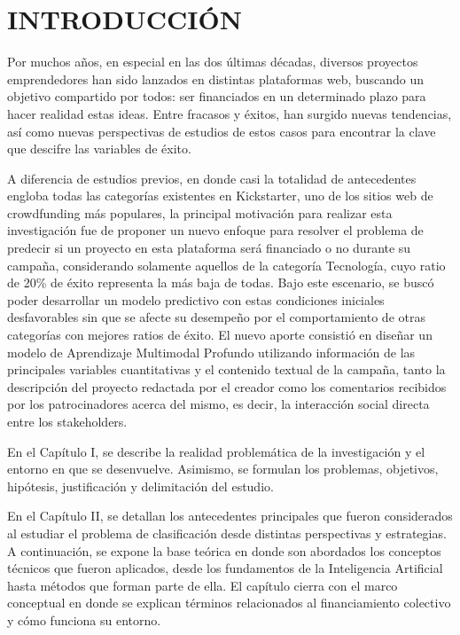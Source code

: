 
\chapter*{INTRODUCCIÓN}

Por muchos años, en especial en las dos últimas décadas, diversos proyectos emprendedores han sido lanzados en distintas plataformas web, buscando un objetivo compartido por todos: ser financiados en un determinado plazo para hacer realidad estas ideas. Entre fracasos y éxitos, han surgido nuevas tendencias, así como nuevas perspectivas de estudios de estos casos para encontrar la clave que descifre las variables de éxito.

A diferencia de estudios previos, en donde casi la totalidad de antecedentes engloba todas las categorías existentes en Kickstarter, uno de los sitios web de crowdfunding más populares, la principal motivación para realizar esta investigación fue de proponer un nuevo enfoque para resolver el problema de predecir si un proyecto en esta plataforma será financiado o no durante su campaña, considerando solamente aquellos de la categoría Tecnología, cuyo ratio de 20\% de éxito representa la más baja de todas. Bajo este escenario, se buscó poder desarrollar un modelo predictivo con estas condiciones iniciales desfavorables sin que se afecte su desempeño por el comportamiento de otras categorías con mejores ratios de éxito. El nuevo aporte consistió en diseñar un modelo de Aprendizaje Multimodal Profundo utilizando información de las principales variables cuantitativas y el contenido textual de la campaña, tanto la descripción del proyecto redactada por el creador como los comentarios recibidos por los patrocinadores acerca del mismo, es decir, la interacción social directa entre los stakeholders.

En el Capítulo I, se describe la realidad problemática de la investigación y el entorno en que se desenvuelve. Asimismo, se formulan los problemas, objetivos, hipótesis, justificación y delimitación del estudio.

En el Capítulo II, se detallan los antecedentes principales que fueron considerados al estudiar el problema de clasificación desde distintas perspectivas y estrategias. A continuación, se expone la base teórica en donde son abordados los conceptos técnicos que fueron aplicados, desde los fundamentos de la Inteligencia Artificial hasta métodos que forman parte de ella. El capítulo cierra con el marco conceptual en donde se explican términos relacionados al financiamiento colectivo y cómo funciona su entorno.

